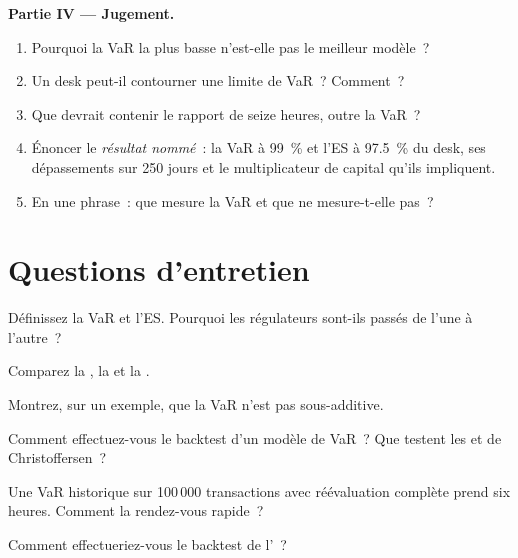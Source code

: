 \begin{problem}
\medskip\noindent\textbf{Partie IV --- Jugement.}
\begin{enumerate}[resume]
\item Pourquoi la VaR la plus basse n'est-elle pas le meilleur modèle~?
\item Un desk peut-il contourner une limite de VaR~? Comment~?
\item Que devrait contenir le rapport de seize heures, outre la VaR~?
\item Énoncer le \emph{résultat nommé}~: la VaR à 99~\% et l'ES à 97.5~\% du desk, ses dépassements sur 250
jours et le multiplicateur de capital qu'ils impliquent.
\item En une phrase~: que mesure la VaR et que ne mesure-t-elle pas~?
\end{enumerate}
\end{problem}

\section{Questions d'entretien}

\begin{interviewq}\label{iq:rc:market-risk-measures:1}
Définissez la VaR et l'ES. Pourquoi les régulateurs sont-ils passés de l'une à l'autre~?
\end{interviewq}

\begin{interviewq}\label{iq:rc:market-risk-measures:2}
Comparez la , la  et la .
\end{interviewq}

\begin{interviewq}\label{iq:rc:market-risk-measures:3}
Montrez, sur un exemple, que la VaR n'est pas sous-additive.
\end{interviewq}

\begin{interviewq}\label{iq:rc:market-risk-measures:4}
Comment effectuez-vous le backtest d'un modèle de VaR~? Que testent les  et de Christoffersen~?
\end{interviewq}

\begin{interviewq}\label{iq:rc:market-risk-measures:5}
Une VaR historique sur 100\,000 transactions avec réévaluation complète prend six heures. Comment la rendez-vous
rapide~?
\end{interviewq}

\begin{interviewq}\label{iq:rc:market-risk-measures:6}
Comment effectueriez-vous le backtest de l'~?
\end{interviewq}
